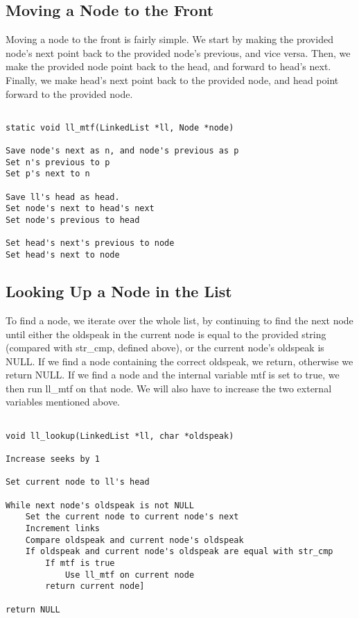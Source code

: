 \documentclass[11pt]{article}
\begin{document}
\subsection{Moving a Node to the Front}

Moving a node to the front is fairly simple. We start by making the provided node's next point back to the provided node's previous, and vice versa. Then, we make the provided node point back to the head, and forward to head's next. Finally, we make head's next point back to the provided node, and head point forward to the provided node.

\begin{verbatim}

static void ll_mtf(LinkedList *ll, Node *node)

Save node's next as n, and node's previous as p
Set n's previous to p
Set p's next to n

Save ll's head as head.
Set node's next to head's next
Set node's previous to head

Set head's next's previous to node
Set head's next to node

\end{verbatim}

\subsection{Looking Up a Node in the List}

To find a node, we iterate over the whole list, by continuing to find the next node until either the oldspeak in the current node is equal to the provided string (compared with str\_cmp, defined above), or the current node's oldspeak is NULL. If we find a node containing the correct oldspeak, we return, otherwise we return NULL. If we find a node and the internal variable mtf is set to true, we then run ll\_mtf on that node. We will also have to increase the two external variables mentioned above.

\begin{verbatim}

void ll_lookup(LinkedList *ll, char *oldspeak)

Increase seeks by 1

Set current node to ll's head

While next node's oldspeak is not NULL
    Set the current node to current node's next
    Increment links
    Compare oldspeak and current node's oldspeak
    If oldspeak and current node's oldspeak are equal with str_cmp
        If mtf is true
            Use ll_mtf on current node
        return current node]

return NULL

\end{verbatim}
\end{document}
